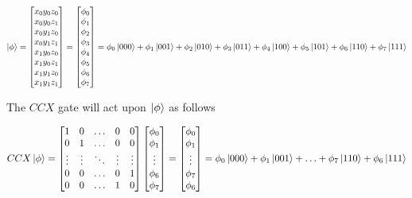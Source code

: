 \begin{equation}
    \ket{\phi}=
    \begin{bmatrix}
        x_0y_0z_0\\
        x_0y_0z_1\\
        x_0y_1z_0\\
        x_0y_1z_1\\
        x_1y_0z_0\\
        x_1y_0z_1\\
        x_1y_1z_0\\
        x_1y_1z_1\\
    \end{bmatrix}=
    \begin{bmatrix}
        \phi_0\\
        \phi_1\\
        \phi_2\\
        \phi_3\\
        \phi_4\\
        \phi_5\\
        \phi_6\\
        \phi_7
    \end{bmatrix}=
    \phi_0\ket{000}+\phi_1\ket{001}+\phi_2\ket{010}+\phi_3\ket{011}+\phi_4\ket{100}+\phi_5\ket{101}+\phi_6\ket{110}+\phi_7\ket{111}
\end{equation}

The $CCX$ gate will act upon $\ket{\phi}$ as follows

\begin{equation}
    CCX\ket{\phi}=\begin{bmatrix}
        1 & 0 & \hdots & 0 & 0 \\
        0 & 1 & \hdots & 0 & 0 \\
        \vdots & \vdots & \ddots & \vdots & \vdots \\
        0 & 0 & \hdots & 0 & 1 \\
        0 & 0 & \hdots & 1 & 0 \\
    \end{bmatrix}
    \begin{bmatrix}
        \phi_0\\
        \phi_1\\
        \vdots \\
        \phi_6\\
        \phi_7
    \end{bmatrix}=
    \begin{bmatrix}
        \phi_0\\
        \phi_1\\
        \vdots \\
        \phi_7\\
        \phi_6
    \end{bmatrix}=
    \phi_0\ket{000}+\phi_1\ket{001}+\hdots+\phi_7\ket{110}+\phi_6\ket{111}
\end{equation}

